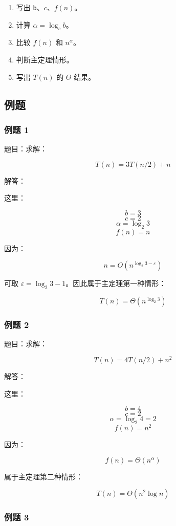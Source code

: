 \documentclass[UTF8,zihao=-4]{ctexart}
\begin{document}
\begin{enumerate}
\item 写出 \texttt{b}、$c$、$f(n)$。
\item 计算 $\alpha = \log_c b$。
\item 比较 $f(n)$ 和 $n^\alpha$。
\item 判断主定理情形。
\item 写出 $T(n)$ 的 $\Theta$ 结果。
\end{enumerate}

\subsection*{例题}

\subsubsection*{例题 1}

题目：求解：

\[T(n) = 3T(n/2) + n\]

解答：

这里：

\[b = 3\]
\[c = 2\]
\[\alpha = \log_2 3\]
\[f(n) = n\]

因为：

\[n = O(n^{\log_2 3 - \varepsilon})\]

可取 $\varepsilon = \log_2 3 - 1$。因此属于主定理第一种情形：

\[T(n) = \Theta(n^{\log_2 3})\]

\subsubsection*{例题 2}

题目：求解：

\[T(n) = 4T(n/2) + n^{2}\]

解答：

这里：

\[b = 4\]
\[c = 2\]
\[\alpha = \log_2 4 = 2\]
\[f(n) = n^{2}\]

因为：

\[f(n) = \Theta(n^\alpha)\]

属于主定理第二种情形：

\[T(n) = \Theta(n^{2} \log n)\]

\subsubsection*{例题 3}
\end{document}
